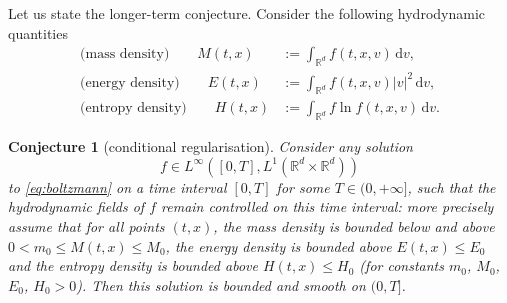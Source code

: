 \documentclass[11pt]{article}
\theoremstyle{plain}
\newtheorem*{conj*}{Conjecture}
\theoremstyle{definition}
\numberwithin{equation}{section}
\newcommand{\R}{\mathbb R}
\newcommand{\dd} {\, \mathrm{d}}
\begin{document}
Let us state the longer-term conjecture. Consider the following
hydrodynamic quantities
\begin{align*}
\text{(mass density)} \qquad M (t,x) &:= \int_{\R^d} f(t,x,v) \dd v, \\
\text{(energy density)} \qquad E (t,x) & := \int_{\R^d} f(t,x,v) |v|^2 \dd v, \\
\text{(entropy density)} \qquad H (t,x) & := \int_{\R^d} f \ln f (t,x,v) \dd v.
\end{align*}

\begin{conj*}[conditional regularisation]
Consider any
solution
\[
f \in L^\infty([0,T],L^1(\R^d \times \R^d))
\]
to \eqref{eq:boltzmann} on a time interval $[0,T]$ for some
$T \in (0,+\infty]$, such that the hydrodynamic fields of $f$ remain
controlled on this time interval: more precisely assume that for all
points $(t,x)$, the mass density is bounded below and above
$0 < m_0 \leq M(t,x) \leq M_0$, the energy density is bounded above
$E(t,x) \leq E_0$ and the entropy density is bounded above
$H(t,x) \leq H_0$ (for constants $m_0$, $M_0$, $E_0$, $H_0>0$). Then
this solution is bounded and smooth on
$(0,T]$.
\end{conj*}
\end{document}
